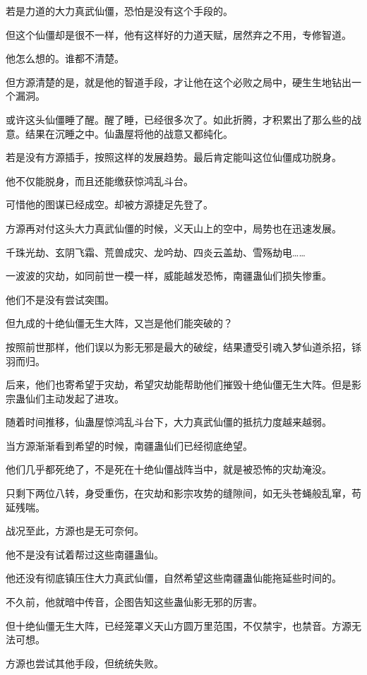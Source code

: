 \begin{this_body}
若是力道的大力真武仙僵，恐怕是没有这个手段的。

但这个仙僵却是很不一样，他有这样好的力道天赋，居然弃之不用，专修智道。

他怎么想的。谁都不清楚。

但方源清楚的是，就是他的智道手段，才让他在这个必败之局中，硬生生地钻出一个漏洞。

或许这头仙僵睡了醒。醒了睡，已经很多次了。如此折腾，才积累出了那么些的战意。结果在沉睡之中。仙蛊屋将他的战意又都纯化。

若是没有方源插手，按照这样的发展趋势。最后肯定能叫这位仙僵成功脱身。

他不仅能脱身，而且还能缴获惊鸿乱斗台。

可惜他的图谋已经成空。却被方源捷足先登了。

方源再对付这头大力真武仙僵的时候，义天山上的空中，局势也在迅速发展。

千珠光劫、玄阴飞霜、荒兽成灾、龙吟劫、四炎云盖劫、雪殇劫电……

一波波的灾劫，如同前世一模一样，威能越发恐怖，南疆蛊仙们损失惨重。

他们不是没有尝试突围。

但九成的十绝仙僵无生大阵，又岂是他们能突破的？

按照前世那样，他们误以为影无邪是最大的破绽，结果遭受引魂入梦仙道杀招，铩羽而归。

后来，他们也寄希望于灾劫，希望灾劫能帮助他们摧毁十绝仙僵无生大阵。但是影宗蛊仙们主动发起了进攻。

随着时间推移，仙蛊屋惊鸿乱斗台下，大力真武仙僵的抵抗力度越来越弱。

当方源渐渐看到希望的时候，南疆蛊仙们已经彻底绝望。

他们几乎都死绝了，不是死在十绝仙僵战阵当中，就是被恐怖的灾劫淹没。

只剩下两位八转，身受重伤，在灾劫和影宗攻势的缝隙间，如无头苍蝇般乱窜，苟延残喘。

战况至此，方源也是无可奈何。

他不是没有试着帮过这些南疆蛊仙。

他还没有彻底镇压住大力真武仙僵，自然希望这些南疆蛊仙能拖延些时间的。

不久前，他就暗中传音，企图告知这些蛊仙影无邪的厉害。

但十绝仙僵无生大阵，已经笼罩义天山方圆万里范围，不仅禁宇，也禁音。方源无法可想。

方源也尝试其他手段，但统统失败。


\end{this_body}
